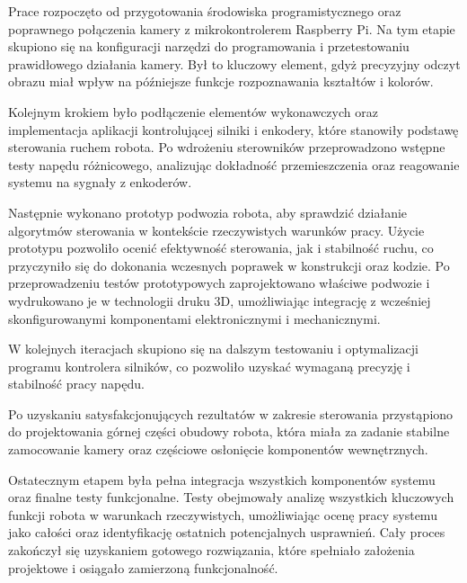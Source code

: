 Prace rozpoczęto od przygotowania środowiska programistycznego oraz poprawnego połączenia kamery z mikrokontrolerem Raspberry Pi. Na tym etapie skupiono się na konfiguracji narzędzi do programowania i przetestowaniu prawidłowego działania kamery. Był to kluczowy element, gdyż precyzyjny odczyt obrazu miał wpływ na późniejsze funkcje rozpoznawania kształtów i kolorów.

Kolejnym krokiem było podłączenie elementów wykonawczych oraz implementacja aplikacji kontrolującej silniki i enkodery, które stanowiły podstawę sterowania ruchem robota. Po wdrożeniu sterowników przeprowadzono wstępne testy napędu różnicowego, analizując dokładność przemieszczenia oraz reagowanie systemu na sygnały z enkoderów. 

Następnie wykonano prototyp podwozia robota, aby sprawdzić działanie algorytmów sterowania w kontekście rzeczywistych warunków pracy. Użycie prototypu pozwoliło ocenić efektywność sterowania, jak i stabilność ruchu, co przyczyniło się do dokonania wczesnych poprawek w konstrukcji oraz kodzie. Po przeprowadzeniu testów prototypowych zaprojektowano właściwe podwozie i wydrukowano je w technologii druku 3D, umożliwiając integrację z wcześniej skonfigurowanymi komponentami elektronicznymi i mechanicznymi.

W kolejnych iteracjach skupiono się na dalszym testowaniu i optymalizacji programu kontrolera silników, co pozwoliło uzyskać wymaganą precyzję i stabilność pracy napędu. 

Po uzyskaniu satysfakcjonujących rezultatów w zakresie sterowania przystąpiono do projektowania górnej części obudowy robota, która miała za zadanie stabilne zamocowanie kamery oraz częściowe osłonięcie komponentów wewnętrznych. 

Ostatecznym etapem była pełna integracja wszystkich komponentów systemu oraz finalne testy funkcjonalne. Testy obejmowały analizę wszystkich kluczowych funkcji robota w warunkach rzeczywistych, umożliwiając ocenę pracy systemu jako całości oraz identyfikację ostatnich potencjalnych usprawnień. Cały proces zakończył się uzyskaniem gotowego rozwiązania, które spełniało założenia projektowe i osiągało zamierzoną funkcjonalność.

